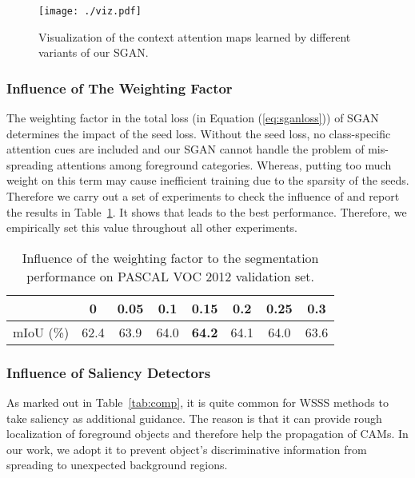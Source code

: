 \documentclass[journal]{IEEEtran}
\begin{document}
\begin{figure}[t]
	\centering
	\texttt{[image: ./viz.pdf]}
	\caption{Visualization of the context attention maps learned by different variants of our SGAN.}
	\label{fig:self}
\end{figure}

\subsubsection{Influence of The Weighting Factor }
The weighting factor  in the total loss (in Equation (\ref{eq:sganloss})) of SGAN determines the impact of the seed loss. Without the seed loss, no class-specific attention cues are included and our SGAN cannot handle the problem of mis-spreading attentions among foreground categories. Whereas, putting too much weight on this term may cause inefficient training due to the sparsity of the seeds. Therefore we carry out a set of experiments to check the influence of  and report the results in Table~\ref{tab:lambda}. It shows that  leads to the best performance. Therefore, we empirically set this value throughout all other experiments. 



\begin{table}[htbp]
	\caption{Influence of the weighting factor  to the segmentation performance on PASCAL VOC 2012 validation set.}
	\label{tab:lambda}
	{\small
		\begin{tabular}{c|ccccccc}
			\hline
			 &0      &0.05    &0.1    &0.15   			 &0.2    &0.25    &0.3 \\ \hline
			mIoU (\%) &62.4   &63.9    &64.0  &\textbf{64.2}    &64.1  &64.0   &63.6 \\ \hline
		\end{tabular}
	}
\end{table}

\subsubsection{Influence of Saliency Detectors}
As marked out in Table~\ref{tab:comp}, it is quite common for WSSS methods to take saliency as additional guidance. The reason is that it can provide rough localization of foreground objects and therefore help the propagation of CAMs. In our work, we adopt it to prevent object's discriminative information from spreading to unexpected background regions. 
\end{document}

